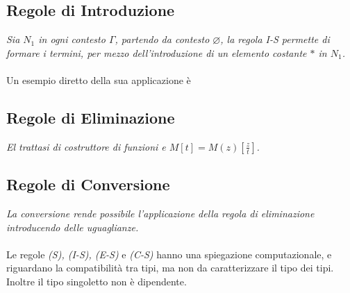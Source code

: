 \subsection{Regole di Introduzione}
\label{subsec:introduzione-singoletto}
\begin{prooftree}
\end{prooftree}
\textit{Sia $N_1$ in ogni contesto $\Gamma$, partendo da contesto $\varnothing$, la regola I-S permette di formare i termini, per mezzo dell'introduzione di un elemento costante $\ast$ in $N_1$.}\\\\
Un esempio diretto della sua applicazione \`e
\begin{prooftree}
\end{prooftree}

\subsection{Regole di Eliminazione}
\label{subsec:eliminazione-singoletto}
\begin{prooftree}
\end{prooftree}
\noindent
\textit{El trattasi di costruttore di funzioni e $M[t] = M(z)[\frac{z}{t}]$.}
\subsection{Regole di Conversione}
\label{subsec:conversione-singoletto}
\begin{prooftree}
\end{prooftree}
\textit{La conversione rende possibile l'applicazione della regola di eliminazione introducendo delle uguaglianze.}
\\\\
Le regole \textit{(S), (I-S), (E-S)} e \textit{(C-S)}  hanno una spiegazione computazionale, e riguardano la compatibilit\`a tra tipi, ma non da caratterizzare il tipo dei tipi.\\ Inoltre il tipo singoletto non \`e dipendente.

